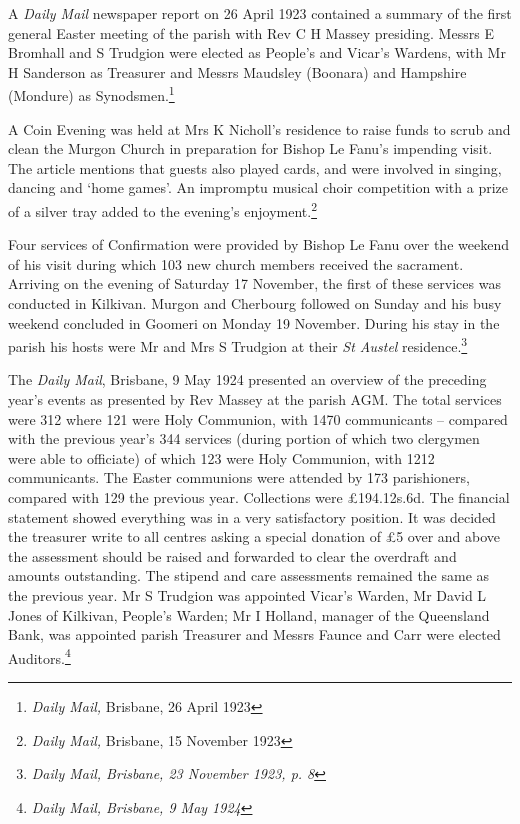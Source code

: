 A \emph{Daily Mail} newspaper report on 26 April 1923 contained a summary of the first general Easter meeting of the parish with Rev C H Massey presiding. Messrs E Bromhall and S Trudgion were elected as People's and Vicar's Wardens, with Mr H Sanderson as Treasurer and Messrs Maudsley (Boonara) and Hampshire (Mondure) as Synodsmen.\footnote{\emph{Daily Mail,} Brisbane, 26 April 1923}


A Coin Evening was held at Mrs K Nicholl's residence to raise funds to scrub and clean the Murgon Church in preparation for Bishop Le Fanu's impending visit. The article mentions that guests also played cards, and were involved in singing, dancing and `home games'. An impromptu musical choir competition with a prize of a silver tray added to the evening's enjoyment.\footnote{\emph{Daily Mail,} Brisbane, 15 November 1923}


Four services of Confirmation were provided by Bishop Le Fanu over the weekend of his visit during which 103 new church members received the sacrament. Arriving on the evening of Saturday 17 November, the first of these services was conducted in Kilkivan. Murgon and Cherbourg followed on Sunday and his busy weekend concluded in Goomeri on Monday 19 November. During his stay in the parish his hosts were Mr and Mrs S Trudgion at their \emph{St Austel} residence.\footnote{\emph{Daily Mail, Brisbane, 23 November 1923, p. 8}}


The \emph{Daily Mail}, Brisbane, 9 May 1924 presented an overview of the preceding year's events as presented by Rev Massey at the parish AGM. The total services were 312 where 121 were Holy Communion, with 1470 communicants -- compared with the previous year's 344 services (during portion of which two clergymen were able to officiate) of which 123 were Holy Communion, with 1212 communicants. The Easter communions were attended by 173 parishioners, compared with 129 the previous year. Collections were \pounds194.12s.6d. The financial statement showed everything was in a very satisfactory position. It was decided the treasurer write to all centres asking a special donation of \pounds5 over and above the assessment should be raised and forwarded to clear the overdraft and amounts outstanding. The stipend and care assessments remained the same as the previous year. Mr S Trudgion was appointed Vicar's Warden, Mr David L Jones of Kilkivan, People's Warden; Mr I Holland, manager of the Queensland Bank, was appointed parish Treasurer and Messrs Faunce and Carr were elected Auditors.\footnote{\emph{Daily Mail, Brisbane, 9 May 1924}}


